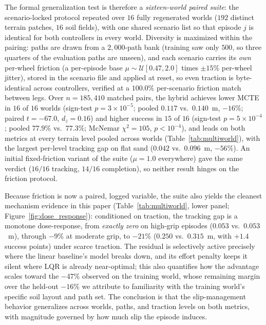 \documentclass[conference]{IEEEtran}
\begin{document}
The formal generalization test is therefore a \emph{sixteen-world paired suite}: the scenario-locked protocol repeated over $16$ fully regenerated worlds ($192$ distinct terrain patches, $16$ soil fields), with one shared scenario list so that episode $j$ is identical for both controllers in every world. Diversity is maximized within the pairing: paths are drawn from a $2{,}000$-path bank (training saw only $500$, so three quarters of the evaluation paths are unseen), and each scenario carries its \emph{own} per-wheel friction (a per-episode base $\mu \sim \mathcal{U}[0.47, 2.0]$ times $\pm15\%$ per-wheel jitter), stored in the scenario file and applied at reset, so even traction is byte-identical across controllers, verified at a $100.0\%$ per-scenario friction match between legs. Over $n = 185{,}410$ matched pairs, the hybrid achieves lower MCTE in $16$ of $16$ worlds (sign-test $p = 3\times10^{-5}$; pooled $0.117$ vs.\ $0.140$~m, $-16\%$; paired $t = -67.0$, $d_z = 0.16$) and higher success in $15$ of $16$ (sign-test $p = 5\times10^{-4}$; pooled $77.9\%$ vs.\ $77.3\%$; McNemar $\chi^2 = 105$, $p < 10^{-4}$), and leads on both metrics at every terrain level pooled across worlds (Table~\ref{tab:multiworld}), with the largest per-level tracking gap on flat sand ($0.042$ vs.\ $0.096$~m, $-56\%$). An initial fixed-friction variant of the suite ($\mu = 1.0$ everywhere) gave the same verdict ($16/16$ tracking, $14/16$ completion), so neither result hinges on the friction protocol.

Because friction is now a paired, logged variable, the suite also yields the cleanest mechanism evidence in this paper (Table~\ref{tab:multiworld}, lower panel; Figure~\ref{fig:dose_response}): conditioned on traction, the tracking gap is a monotone dose-response, from \emph{exactly zero} on high-grip episodes ($0.053$ vs.\ $0.053$~m), through $-9\%$ at moderate grip, to $-21\%$ ($0.250$ vs.\ $0.315$~m, with $+1.4$ success points) under scarce traction. The residual is selectively active precisely where the linear baseline's model breaks down, and its effort penalty keeps it silent where LQR is already near-optimal; this also quantifies how the advantage scales toward the $-47\%$ observed on the training world, whose remaining margin over the held-out $-16\%$ we attribute to familiarity with the training world's specific soil layout and path set. The conclusion is that the slip-management behavior generalizes across worlds, paths, and traction levels on both metrics, with magnitude governed by how much slip the episode induces.
\end{document}
